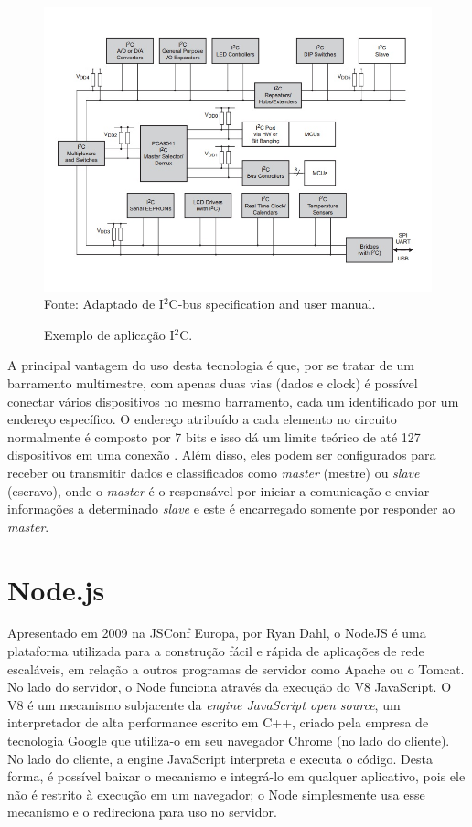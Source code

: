 \begin{itemize}
 \begin{figure}[ht]
  \begin{center}
  \caption{Exemplo de aplicação I$^{2}$C.}
  \includegraphics[scale=0.7]{figuras/cap2/i2c_app.jpg}\\
  Fonte: Adaptado de I$^{2}$C-bus specification and user manual\cite{i2c}.
  \label{i2c}
  \end{center}
  \end{figure}
  
   A principal vantagem do uso desta tecnologia é que, por se tratar de um barramento multimestre, com apenas duas vias (dados e clock) é possível conectar vários dispositivos no mesmo barramento, cada um identificado por um endereço específico. O endereço atribuído a cada elemento no circuito normalmente é composto por 7 bits e isso dá um limite teórico de até 127 dispositivos em uma conexão \cite{arduinocc_i2c}. Além disso, eles podem ser configurados para receber ou transmitir dados e classificados como \textit{master} (mestre) ou \textit{slave} (escravo), onde o \textit{master} é o responsável por iniciar a comunicação e enviar informações a determinado \textit{slave} e este é encarregado somente por responder ao \textit{master}.
 \end{itemize}
 
 
 \section{Node.js}
 
   Apresentado em 2009 na JSConf Europa, por Ryan Dahl, o NodeJS é uma plataforma utilizada para a construção fácil e rápida de aplicações de rede escaláveis, em relação a outros programas de servidor como Apache ou o Tomcat.
   No lado do servidor, o Node funciona através da execução do V8 JavaScript. O V8 é um mecanismo subjacente da \textit{engine JavaScript open source}, um interpretador de alta performance escrito em C++, criado pela empresa de tecnologia Google que utiliza-o em seu navegador Chrome (no lado do cliente). No lado do cliente, a engine JavaScript interpreta e executa o código. Desta forma, é possível baixar o mecanismo e integrá-lo em qualquer aplicativo, pois ele não é restrito à execução em um navegador; o Node simplesmente usa esse mecanismo e o redireciona para uso no servidor.
 
